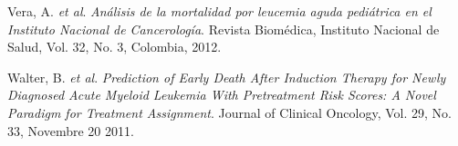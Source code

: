 \documentclass[11pt, oneside]{book}
\begin{document}
\begin{thebibliography}{9}
  Vera, A. \emph{et al}.
  \emph{Análisis de la mortalidad por leucemia aguda pediátrica en el Instituto Nacional de Cancerología}. Revista Biomédica, Instituto Nacional de Salud, Vol. 32, No. 3, Colombia, 2012.

  Walter, B. \emph{et al}.
  \emph{Prediction of Early Death After Induction Therapy for Newly Diagnosed Acute Myeloid Leukemia With Pretreatment Risk Scores: A Novel Paradigm for Treatment Assignment}. Journal of Clinical Oncology, Vol. 29, No. 33, Novembre 20 2011.

\end{thebibliography}
\end{document}

